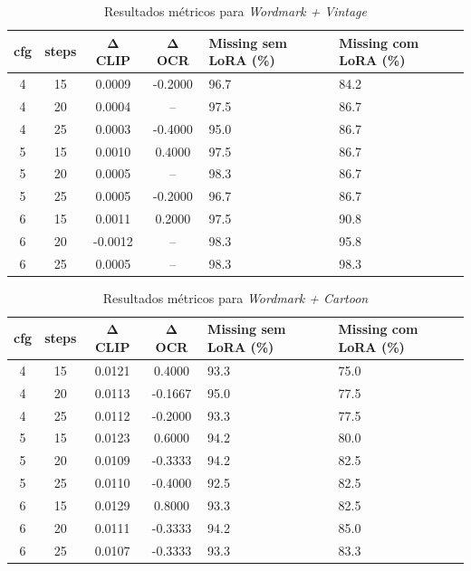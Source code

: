 \documentclass[12pt, %
openright, 
oneside, %
a4paper,    %
brazil]{facom-ufu-abntex2}
\begin{document}
\begin{table}[H]
\centering
\small
\setlength{\tabcolsep}{4pt}
\begin{tabularx}{\linewidth}{|c|c|c|c|X|X|}
\hline
\textbf{cfg} & \textbf{steps} & \(\boldsymbol{\Delta}\) \textbf{CLIP} & \(\boldsymbol{\Delta}\) \textbf{OCR} & \textbf{Missing sem LoRA (\%)} & \textbf{Missing com LoRA (\%)} \\ \hline
4 & 15 & 0.0009 & -0.2000 & 96.7 & 84.2 \\ \hline
4 & 20 & 0.0004 & --      & 97.5 & 86.7 \\ \hline
4 & 25 & 0.0003 & -0.4000 & 95.0 & 86.7 \\ \hline
5 & 15 & 0.0010 & 0.4000  & 97.5 & 86.7 \\ \hline
5 & 20 & 0.0005 & --      & 98.3 & 86.7 \\ \hline
5 & 25 & 0.0005 & -0.2000 & 96.7 & 86.7 \\ \hline
6 & 15 & 0.0011 & 0.2000  & 97.5 & 90.8 \\ \hline
6 & 20 & -0.0012& --      & 98.3 & 95.8 \\ \hline
6 & 25 & 0.0005 & --      & 98.3 & 98.3 \\ \hline
\end{tabularx}
\caption{Resultados métricos para \textit{Wordmark + Vintage}}
\label{tab:metrics_wm_vintage}
\end{table}

\begin{table}[H]
\centering
\small
\setlength{\tabcolsep}{4pt}
\begin{tabularx}{\linewidth}{|c|c|c|c|X|X|}
\hline
\textbf{cfg} & \textbf{steps} & \(\boldsymbol{\Delta}\) \textbf{CLIP} & \(\boldsymbol{\Delta}\) \textbf{OCR} & \textbf{Missing sem LoRA (\%)} & \textbf{Missing com LoRA (\%)} \\ \hline
4 & 15 & 0.0121 & 0.4000  & 93.3 & 75.0 \\ \hline
4 & 20 & 0.0113 & -0.1667 & 95.0 & 77.5 \\ \hline
4 & 25 & 0.0112 & -0.2000 & 93.3 & 77.5 \\ \hline
5 & 15 & 0.0123 & 0.6000  & 94.2 & 80.0 \\ \hline
5 & 20 & 0.0109 & -0.3333 & 94.2 & 82.5 \\ \hline
5 & 25 & 0.0110 & -0.4000 & 92.5 & 82.5 \\ \hline
6 & 15 & 0.0129 & 0.8000  & 93.3 & 82.5 \\ \hline
6 & 20 & 0.0111 & -0.3333 & 94.2 & 85.0 \\ \hline
6 & 25 & 0.0107 & -0.3333 & 93.3 & 83.3 \\ \hline
\end{tabularx}
\caption{Resultados métricos para \textit{Wordmark + Cartoon}}
\label{tab:metrics_wm_cartoon}
\end{table}
\end{document}
